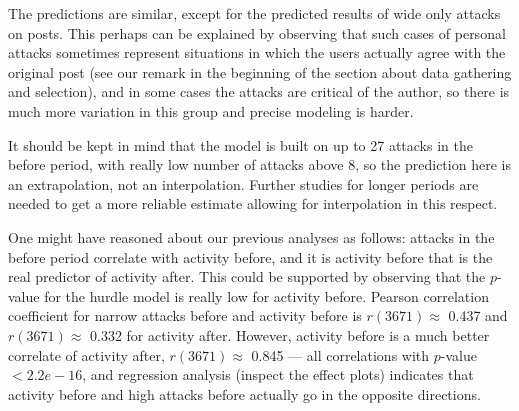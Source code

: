 \documentclass[10pt,]{scrartcl}
\begin{document}
\begin{table}
\centering\begingroup\fontsize{9}{11}\selectfont

\endgroup{}
\end{table}

\normalsize

The predictions are similar, except for the predicted results of wide
only attacks on posts. This perhaps can be explained by observing that
such cases of personal attacks sometimes represent situations in which
the users actually agree with the original post (see our remark in the
beginning of the section about data gathering and selection), and in
some cases the attacks are critical of the author, so there is much more
variation in this group and precise modeling is harder.

It should be kept in mind that the model is built on up to 27 attacks in
the \textsf{before} period, with really low number of attacks above 8,
so the prediction here is an extrapolation, not an interpolation.
Further studies for longer periods are needed to get a more reliable
estimate allowing for interpolation in this respect.

One might have reasoned about our previous analyses as follows: attacks
in the before period correlate with activity before, and it is activity
before that is the real predictor of activity after. This could be
supported by observing that the \(p\)-value for the hurdle model is
really low for activity before. Pearson correlation coefficient for
narrow attacks before and activity before is \(r(3671)\approx\) 0.437
and \(r(3671)\approx\) 0.332 for activity after. However, activity
before is a much better correlate of activity after, \(r(3671)\approx\)
0.845 --- all correlations with \(p\)-value \(<2.2e-16\), and regression
analysis (inspect the effect plots) indicates that activity before and
high attacks before actually go in the opposite directions.
\end{document}
